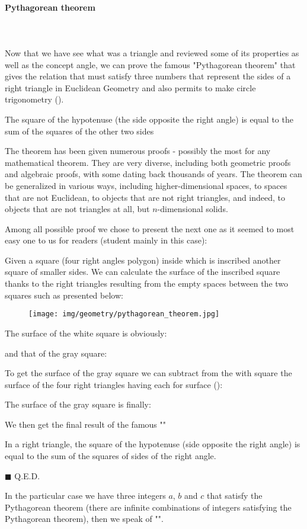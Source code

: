 	\pagebreak
	\paragraph{Pythagorean theorem}\label{pythagorean theorem}\mbox{}\\\\
	Now that we have see what was a triangle and reviewed some of its properties as well as the concept angle, we can prove the famous "Pythagorean theorem" that gives the relation that must satisfy three numbers that represent the sides of a right triangle in Euclidean Geometry and also permits to make circle trigonometry ().
	
	\begin{theorem}
	The square of the hypotenuse (the side opposite the right angle) is equal to the sum of the squares of the other two sides
	\end{theorem}
	The theorem has been given numerous proofs - possibly the most for any mathematical theorem. They are very diverse, including both geometric proofs and algebraic proofs, with some dating back thousands of years. The theorem can be generalized in various ways, including higher-dimensional spaces, to spaces that are not Euclidean, to objects that are not right triangles, and indeed, to objects that are not triangles at all, but $n$-dimensional solids.
	
	Among all possible proof we chose to present the next one as it seemed to most easy one to us for readers (student mainly in this case):
	\begin{dem}
	Given a square (four right angles polygon) inside which is inscribed another square of smaller sides. We can calculate the surface of the inscribed square thanks to the right triangles resulting from the empty spaces between the two squares such as presented below:
	\begin{figure}[H]
		\centering
		\texttt{[image: img/geometry/pythagorean\_theorem.jpg]}
	\end{figure}
	The surface of the white square is obviously:
	
	and that of the gray square:
	
	To get the surface of the gray square we can subtract from the with square the surface of the four right triangles having each for surface ():
	
	The surface of the gray square is finally:
	
	We then get the final result of the famous ""
	
	In a right triangle, the square of the hypotenuse (side opposite the right angle) is equal to the sum of the squares of sides of the right angle.
	\begin{flushright}
		$\blacksquare$  Q.E.D.
	\end{flushright}
	\end{dem}
	In the particular case we have three integers $a$, $b$ and $c$ that satisfy the Pythagorean theorem (there are infinite combinations of integers satisfying the Pythagorean theorem), then we speak of "".
	
